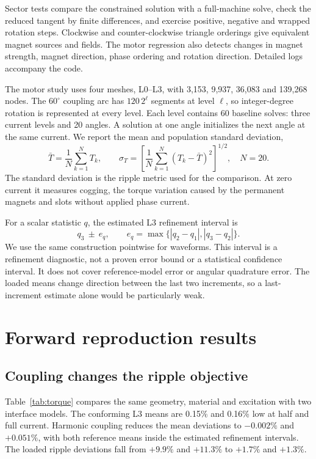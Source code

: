 \documentclass{anvil-paper}
\begin{document}
Sector tests compare the constrained solution with a full-machine solve,
check the reduced tangent by finite differences, and exercise positive,
negative and wrapped rotation steps. Clockwise and counter-clockwise
triangle orderings give equivalent magnet sources and fields. The motor
regression also detects changes in magnet strength, magnet direction,
phase ordering and rotation direction. Detailed logs accompany the code.

The motor study uses four meshes, L0--L3, with 3,153, 9,937, 36,083 and
139,268 nodes. The $60^\circ$ coupling arc has $120\,2^\ell$ segments at level
$\ell$, so integer-degree rotation is represented at every level.
Each level contains 60 baseline solves: three current levels and 20
angles. A solution at one angle initializes the next angle at the same
current. We report the mean and population standard deviation,
\begin{equation}
 \bar T=\frac1N\sum_{k=1}^N T_k,\qquad
 \sigma_T=\left[\frac1N\sum_{k=1}^N(T_k-\bar T)^2\right]^{1/2},
 \quad N=20.
\end{equation}
The standard deviation is the ripple metric used for the comparison.
At zero current it measures cogging, the torque variation caused by the
permanent magnets and slots without applied phase current.

For a scalar statistic $q$, the estimated L3 refinement interval is
\begin{equation}
 q_3\ \pm\ e_q,\qquad
 e_q=\max\{|q_2-q_1|,|q_3-q_2|\}.
 \label{eq:band}
\end{equation}
We use the same construction pointwise for waveforms. This interval is a
refinement diagnostic, not a proven error bound or a statistical confidence
interval. It does not cover reference-model error or angular quadrature
error. The loaded means change direction between the last two increments,
so a last-increment estimate alone would be particularly weak.

\section{Forward reproduction results}
\subsection{Coupling changes the ripple objective}
Table~\ref{tab:torque} compares the same geometry, material and excitation
with two interface models. The conforming L3 means are 0.15\% and 0.16\%
low at half and full current. Harmonic coupling reduces the mean deviations
to $-0.002\%$ and $+0.051\%$, with both reference means inside the estimated
refinement intervals. The loaded ripple deviations fall from $+9.9\%$
and $+11.3\%$ to $+1.7\%$ and $+1.3\%$.
\end{document}
